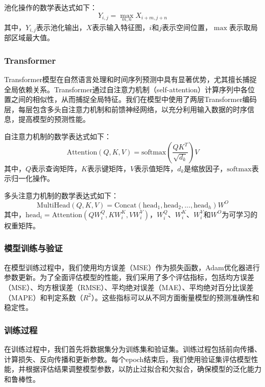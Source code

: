 \documentclass[withoutpreface,bwprint]{cumcmthesis} %
\begin{document}
池化操作的数学表达式如下：
\begin{equation}
Y_{i,j} = \max_{m,n} X_{i+m,j+n}
\end{equation}
其中，$Y_{i,j}$表示池化输出，$X$表示输入特征图，$i$和$j$表示空间位置，$\max$表示取局部区域最大值。

\subsubsection{Transformer}
Transformer模型在自然语言处理和时间序列预测中具有显著优势，尤其擅长捕捉全局依赖关系\cite{bib:six}。Transformer通过自注意力机制（self-attention）计算序列中各位置之间的相似性，从而捕捉全局特征。我们在模型中使用了两层Transformer编码层，每层包含多头自注意力机制和前馈神经网络，以充分利用输入数据的时序信息，提高模型的预测性能\cite{bib:two}。

自注意力机制的数学表达式如下：
\begin{equation}
\text{Attention}(Q, K, V) = \text{softmax}\left(\frac{QK^T}{\sqrt{d_k}}\right)V
\end{equation}
其中，$Q$表示查询矩阵，$K$表示键矩阵，$V$表示值矩阵，$d_k$是缩放因子，$\text{softmax}$表示归一化操作。\cite{bib:two}

多头注意力机制的数学表达式如下：
\begin{equation}
\text{MultiHead}(Q, K, V) = \text{Concat}(\text{head}_1, \text{head}_2, ..., \text{head}_h)W^O
\end{equation}
其中，$\text{head}_i = \text{Attention}(QW_i^Q, KW_i^K, VW_i^V)$，$W_i^Q$、$W_i^K$、$W_i^V$和$W^O$为可学习的权重矩阵。\cite{bib:four}


\subsubsection{模型训练与验证}
在模型训练过程中，我们使用均方误差（MSE）作为损失函数，Adam优化器进行参数更新。为了全面评估模型的性能，我们采用了多个评估指标，包括均方误差（MSE）、均方根误差（RMSE）、平均绝对误差（MAE）、平均绝对百分比误差（MAPE）和判定系数（$R^2$）。这些指标可以从不同方面衡量模型的预测准确性和稳定性。\cite{bib:six}

\subsubsection{训练过程}
在训练过程中，我们首先将数据集分为训练集和验证集。训练过程包括前向传播、计算损失、反向传播和更新参数。每个epoch结束后，我们使用验证集评估模型性能，并根据评估结果调整模型参数，以防止过拟合和欠拟合，确保模型的泛化能力和鲁棒性。
\end{document}
